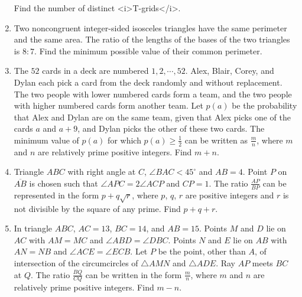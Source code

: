 \documentclass{article}
\begin{document}
\begin{enumerate}[label=\arabic*., itemsep=0.5em]
Find the number of distinct <i>T-grids</i>.\par \vspace{0.5em}\item Two noncongruent integer-sided isosceles triangles have the same perimeter and the same area. The ratio of the lengths of the bases of the two triangles is $8: 7$. Find the minimum possible value of their common perimeter.\par \vspace{0.5em}\item The $52$ cards in a deck are numbered $1, 2, \cdots, 52$. Alex, Blair, Corey, and Dylan each pick a card from the deck randomly and without replacement. The two people with lower numbered cards form a team, and the two people with higher numbered cards form another team. Let $p(a)$ be the probability that Alex and Dylan are on the same team, given that Alex picks one of the cards $a$ and $a+9$, and Dylan picks the other of these two cards. The minimum value of $p(a)$ for which $p(a)\ge\frac{1}{2}$ can be written as $\frac{m}{n}$, where $m$ and $n$ are relatively prime positive integers. Find $m+n$.\par \vspace{0.5em}\item Triangle $ABC$ with right angle at $C$, $\angle BAC < 45^\circ$ and $AB = 4$. Point $P$ on $\overline{AB}$ is chosen such that $\angle APC = 2\angle ACP$ and $CP = 1$. The ratio $\frac{AP}{BP}$ can be represented in the form $p + q\sqrt{r}$, where $p$, $q$, $r$ are positive integers and $r$ is not divisible by the square of any prime. Find $p+q+r$.\par \vspace{0.5em}\item In triangle $ABC$, $AC=13$, $BC=14$, and $AB=15$. Points $M$ and $D$ lie on $AC$ with $AM=MC$ and $\angle ABD = \angle DBC$. Points $N$ and $E$ lie on $AB$ with $AN=NB$ and $\angle ACE = \angle ECB$. Let $P$ be the point, other than $A$, of intersection of the circumcircles of $\triangle AMN$ and $\triangle ADE$. Ray $AP$ meets $BC$ at $Q$. The ratio $\frac{BQ}{CQ}$ can be written in the form $\frac{m}{n}$, where $m$ and $n$ are relatively prime positive integers. Find $m-n$.\par \vspace{0.5em}\end{enumerate}
\end{document}
